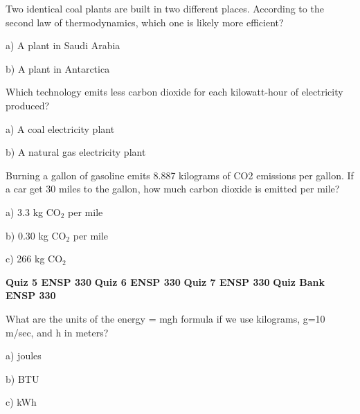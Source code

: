 \documentclass[12pt, oneside]{article}
\begin{document}
\problem{}
Two identical coal plants are built in two different places.  According
to the second law of thermodynamics, which one is likely more efficient?

a) A plant in Saudi Arabia

b) A plant in Antarctica


\problem{}
Which technology emits less carbon dioxide for each kilowatt-hour of
electricity produced?

a) A coal electricity plant

b) A natural gas electricity plant

\problem{}
Burning a gallon of gasoline emits 8.887 kilograms of CO2 emissions per
gallon.  If a car get 30 miles to the gallon, how much carbon dioxide is
emitted per mile?

a) 3.3 kg CO$_2$ per mile %

b) 0.30 kg CO$_2$ per mile

c) 266 kg CO$_2$ %



\newpage
\setcounter{problem}{0}
{\bf Quiz 5 \hfill ENSP 330}
\newpage
\setcounter{problem}{0}
{\bf Quiz 6 \hfill ENSP 330}
\newpage
\setcounter{problem}{0}
{\bf Quiz 7 \hfill ENSP 330}
\newpage
\setcounter{problem}{0}
{\bf Quiz Bank \hfill ENSP 330}


\problem{}
What are the units of the energy = mgh formula if we use kilograms, g=10
m/sec, and h in meters?

a) joules

b) BTU

c) kWh
\end{document}

